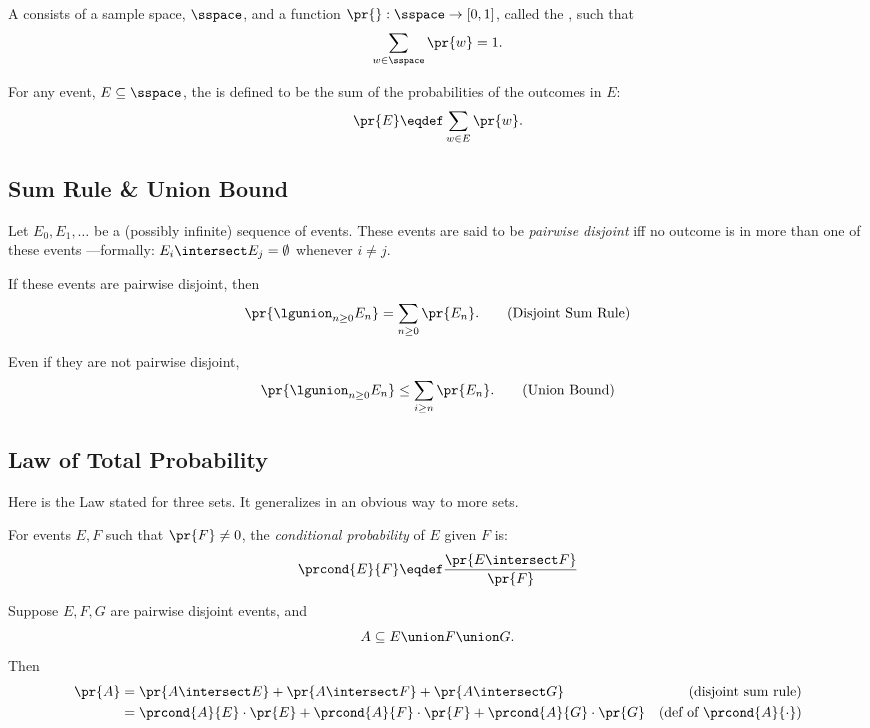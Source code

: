 \documentclass[handout]{mcs}
\begin{document}
  A  consists of a sample
  space, $\sspace$, and a function $\pr{}: \sspace\to [0,1]$, called
  the , such that
\[
\sum_{w \in \sspace} \pr{w} = 1.
\]

For any event, $E \subseteq \sspace$, the  is
defined to be the sum of the probabilities of the outcomes in $E$:
\[
\pr{E} \eqdef \sum_{w \in E} \pr{w}.
\]


\subsection{Sum Rule \& Union Bound}

Let $E_0,E_1,\dots$ be a (possibly infinite) sequence of events.  These
events are said to be \emph{pairwise disjoint} iff no outcome is in more
than one of these events ---formally: $E_i \intersect E_j = \emptyset$
whenever $i \neq j$.

If these events are pairwise disjoint, then
\begin{equation}
\pr{\lgunion_{n \geq 0} E_n} = \sum_{n \geq 0} \pr{E_n}.\tag{Disjoint Sum Rule}
\end{equation}

Even if they are not pairwise disjoint,
\begin{equation}
\pr{\lgunion_{n \geq 0} E_n} \leq \sum_{i \geq n} \pr{E_n}.\tag{Union Bound}
\end{equation}


\subsection{Law of Total Probability}

Here is the Law stated for three sets.  It generalizes in an obvious way
to more sets.

\begin{rul*}

  For events $E,F$ such that $\pr{F} \neq 0$, the \emph{conditional
    probability} of $E$ given $F$ is:
\[
\prcond{E}{F} \eqdef \frac{\pr{E \intersect F}}{\pr{F}}
\]

Suppose $E,F,G$ are pairwise disjoint events, and
\[
A \subseteq E \union F \union G. 
\]
Then
\begin{align*}
\pr{A} & = \pr{A \intersect E}+ 
           \pr{A \intersect F}+ 
           \pr{A \intersect G} & \textrm{(disjoint sum rule)}\\
 & = \prcond{A}{E} \cdot \pr{E} +
         \prcond{A}{F} \cdot \pr{F} +
         \prcond{A}{G} \cdot \pr{G} & \textrm{(def of $\prcond{A}{\cdot}$)}
\end{align*}
\end{rul*}
\fi
\end{document}
